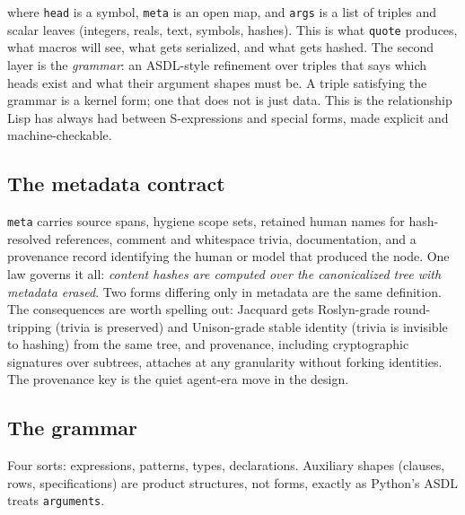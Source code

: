 \documentclass[11pt]{article}
\newcommand{\jacquard}{Jacquard}
\begin{document}
\noindent
where \texttt{head} is a symbol, \texttt{meta} is an open map, and \texttt{args} is a list of triples and scalar leaves (integers, reals, text, symbols, hashes). This is what \texttt{quote} produces, what macros will see, what gets serialized, and what gets hashed. The second layer is the \emph{grammar}: an ASDL-style refinement over triples that says which heads exist and what their argument shapes must be. A triple satisfying the grammar is a kernel form; one that does not is just data. This is the relationship Lisp has always had between S-expressions and special forms, made explicit and machine-checkable.

\subsection{The metadata contract}

\texttt{meta} carries source spans, hygiene scope sets, retained human names for hash-resolved references, comment and whitespace trivia, documentation, and a provenance record identifying the human or model that produced the node. One law governs it all: \emph{content hashes are computed over the canonicalized tree with metadata erased}. Two forms differing only in metadata are the same definition. The consequences are worth spelling out: \jacquard{} gets Roslyn-grade round-tripping (trivia is preserved) and Unison-grade stable identity (trivia is invisible to hashing) from the same tree, and provenance, including cryptographic signatures over subtrees, attaches at any granularity without forking identities. The provenance key is the quiet agent-era move in the design.

\subsection{The grammar}

Four sorts: expressions, patterns, types, declarations. Auxiliary shapes (clauses, rows, specifications) are product structures, not forms, exactly as Python's ASDL treats \texttt{arguments}.
\end{document}
